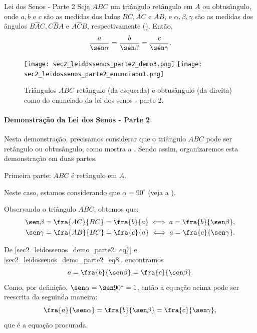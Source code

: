 \begin{observationtitle}{Lei dos Senos - Parte 2}
\label{sec2_leidossenos_parte2}
Seja $ABC$ um triângulo retângulo em $A$ ou obtusângulo, onde $a, b$ e $c$ são as medidas dos lados $BC, AC$ e $AB$, e $\alpha, \beta, \gamma$ são as medidas dos ângulos $B\hat{A}C,C\hat{B}A$ e $A\hat{C}B$, respectivamente (). Então,
\begin{equation}\label{sec2_leidossenos_eq_parte2}
    \frac{a}{\sen\alpha} = \frac{b}{\sen\beta} = \frac{c}{\sen\gamma}.
\end{equation}
\begin{figure}[H]
    \centering
    \texttt{[image: sec2\_leidossenos\_parte2\_demo3.png]}
    \qquad
    \texttt{[image: sec2\_leidossenos\_parte2\_enunciado1.png]}
    \caption{Triângulos $ABC$ retângulo (da esquerda) e obtusângulo (da direita) como do enunciado da lei dos senos - parte 2.}
    \label{sec2_leidossenos_parte2_enunciado_fig}
\end{figure}

\end{observationtitle}


\paragraph{Demonstração da Lei dos Senos - Parte 2}

Nesta demonstração, precisamos considerar que o triângulo $ABC$ pode ser retângulo ou obtusângulo, como mostra a . Sendo assim, organizaremos esta demonstração em duas partes. 

Primeira parte: $ABC$ é retângulo em $A$.

Neste caso, estamos considerando que $\alpha=90^\circ$ (veja a ).

Observando o triângulo $ABC$, obtemos que:
\begin{eqnarray}
\sen\beta=\fra{AC}{BC}=\fra{b}{a} \iff a=\fra{b}{\sen\beta},   \label{sec2_leidossenos_demo_parte2_eq7} \\ 
\sen\gamma=\fra{AB}{BC}=\fra{c}{a} \iff a=\fra{c}{\sen\gamma}.   \label{sec2_leidossenos_demo_parte2_eq8} 
\end{eqnarray}

De \eqref{sec2_leidossenos_demo_parte2_eq7} e \eqref{sec2_leidossenos_demo_parte2_eq8}, encontramos
$$a=\fra{b}{\sen\beta}=\fra{c}{\sen\beta}.$$
Como, por definição, $\sen\alpha=\sen90^\circ=1$, então a equação acima pode ser reescrita da seguinda maneira: 
$$\fra{a}{\sen\alpha}=\fra{b}{\sen\beta}=\fra{c}{\sen\gamma},$$
que é a equação procurada.

